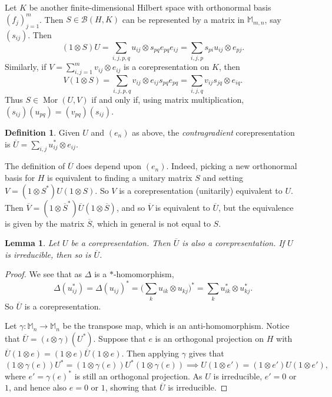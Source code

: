 \documentclass[twoside,a4paper,12pt]{article}
\theoremstyle{plain}
\newtheorem{lemma}[proposition]{Lemma}
\theoremstyle{definition}
\newtheorem{definition}[proposition]{Definition}
\newcommand{\mc}{\mathcal}
\newcommand{\mor}{\operatorname{Mor}}
\begin{document}
Let $K$ be another finite-dimensional Hilbert space with orthonormal basis
$(f_j)_{j=1}^m$.  Then $S\in\mc B(H,K)$ can be represented by a matrix in
$\mathbb M_{m,n}$, say $(s_{ij})$.  Then
\[ (1\otimes S)U = \sum_{i,j,p,q} u_{ij} \otimes s_{pq} e_{pq} e_{ij}
= \sum_{i,j,p} s_{pi}u_{ij} \otimes e_{pj}. \]
Similarly, if $V=\sum_{i,j=1}^m v_{ij}\otimes e_{ij}$ is a corepresentation
on $K$, then
\[ V(1\otimes S) = \sum_{i,j,p,q} v_{ij} \otimes e_{ij} s_{pq} e_{pq}
= \sum_{i,j,q} v_{ij} s_{jq} \otimes e_{iq}. \]
Thus $S\in\mor(U,V)$ if and only if, using matrix multiplication,
$(s_{ij})(u_{pq}) = (v_{pq})(s_{ij})$.

\begin{definition}
Given $U$ and $(e_n)$ as above, the \emph{contragradient} corepresentation
is $\overline U = \sum_{i,j} u_{ij}^* \otimes e_{ij}$.
\end{definition}

The definition of $\overline U$ does depend upon $(e_n)$.  Indeed, picking
a new orthonormal basis for $H$ is equivalent to finding a unitary matrix
$S$ and setting $V = (1\otimes S^*)U(1\otimes S)$.  So $V$ is a
corepresentation (unitarily) equivalent to $U$.  Then $\overline V
= (1\otimes \overline{S}^*) \overline U (1\otimes \overline{S})$, and so
$\overline V$ is equivalent to $\overline U$, but the equivalence is given by
the matrix $\overline{S}$, which in general is not equal to $S$.

\begin{lemma}\label{lem:contra_irrep}
Let $U$ be a corepresentation.  Then $\overline{U}$ is also a corepresentation.
If $U$ is irreducible, then so is $\overline{U}$.
\end{lemma}
\begin{proof}
We see that as $\Delta$ is a $*$-homomorphism,
\[ \Delta(u_{ij}^*) = \Delta(u_{ij})^*
= \Big( \sum_k u_{ik}\otimes u_{kj} \Big)^*
= \sum_k u_{ik}^* \otimes u_{kj}^*. \]
So $\overline{U}$ is a corepresentation.

Let $\gamma:\mathbb M_n\rightarrow\mathbb M_n$ be the transpose map, which is
an anti-homomorphism.  Notice that $\overline{U} = (\iota\otimes\gamma)(U^*)$.
Suppose that $e$ is an orthogonal projection on $H$ with
$\overline{U}(1\otimes e) = (1\otimes e) \overline{U} (1\otimes e)$.  Then
applying $\gamma$ gives that
\[ (1\otimes\gamma(e))U^* = (1\otimes\gamma(e))U^*(1\otimes\gamma(e))
\implies U(1\otimes e') = (1\otimes e')U(1\otimes e'), \]
where $e'=\gamma(e)^*$ is still an orthogonal projection.  As $U$ is
irreducible, $e'=0$ or $1$, and hence also $e=0$ or $1$, showing that
$\overline{U}$ is irreducible.
\end{proof}
\end{document}
